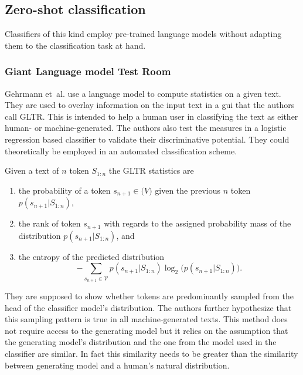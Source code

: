    \subsection{Zero-shot classification}
    \label{sec:zeroShot}
    Classifiers of this kind employ pre-trained language models without adapting them to the classification task at hand.

    \subsubsection{Giant Language model Test Room}
    Gehrmann et~al. \cite{gehrmann2019gltr} use a language model to compute statistics on a given text.
    They are used to overlay information on the input text in a \ac{gui} that the authors call GLTR.
    This is intended to help a human user in classifying the text as either human- or machine-generated.
    The authors also test the measures in a logistic regression based classifier to validate their discriminative potential.
    They could theoretically be employed in an automated classification scheme.
    
    Given a text of $n$ token $S_{1:n}$ the GLTR statistics are 
    \begin{enumerate}
        \item the probability of a token $s_{n+1} \in \mathcal(V)$ given the previous $n$ token $p(s_{n+1} | S_{1:n})$,
        \item the rank of token $s_{n+1}$ with regards to the assigned probability mass of the distribution $p(s_{n+1} | S_{1:n})$, and 
        \item the entropy of the predicted distribution
            \begin{equation*}
                -\sum_{s_{n+1} \in \mathcal{V}} p(s_{n+1} | S_{1:n}) \log_2 \big( p(s_{n+1} | S_{1:n}) \big) \text{.}
            \end{equation*}
    \end{enumerate}
    They are supposed to show whether tokens are predominantly sampled from the head of the classifier model's distribution.
    The authors further hypothesize that this sampling pattern is true in all machine-generated texts.
    This method does not require access to the generating model but it relies on the assumption that the generating model's distribution and the one from the model used in the classifier are similar.
    In fact this similarity needs to be greater than the similarity between generating model and a human's natural distribution.

